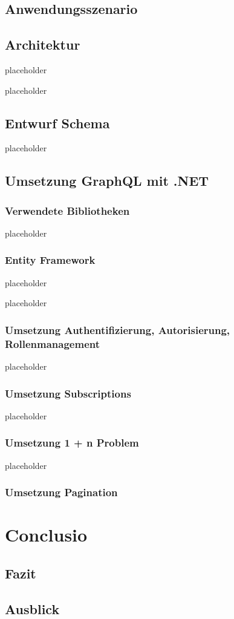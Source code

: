 \documentclass[bachelor, german ]{hgbthesis}
\begin{document}
\section{Anwendungsszenario}

\section{Architektur}

placeholder
\pagebreak

placeholder
\pagebreak

\section{Entwurf Schema}

placeholder
\pagebreak

\section{Umsetzung GraphQL mit .NET}

\subsection{Verwendete Bibliotheken}

placeholder
\pagebreak

\subsection{Entity Framework}

placeholder
\pagebreak

placeholder
\pagebreak

\subsection{Umsetzung Authentifizierung, Autorisierung, Rollenmanagement}

placeholder
\pagebreak

\subsection{Umsetzung Subscriptions}

placeholder
\pagebreak

\subsection{Umsetzung 1 + n Problem}

placeholder
\pagebreak

\subsection{Umsetzung Pagination}

\chapter{Conclusio}

\section{Fazit}

\section{Ausblick}

\printbibliography
\end{document}
